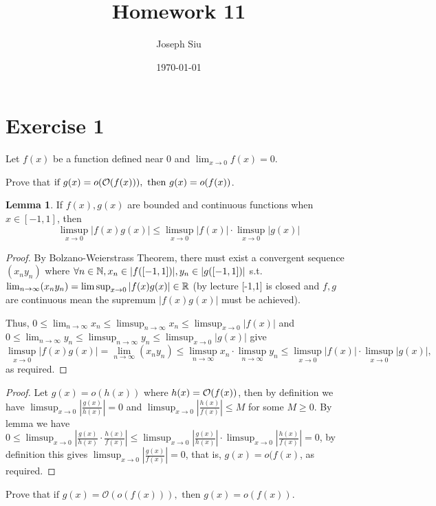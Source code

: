 \documentclass{homework}
\author{Joseph Siu}
\date{\today}
\title{Homework 11}
\newcommand{\R}{\bb{R}} %
\newcommand{\N}{\bb{N}} %
\newcommand{\ra}{\rightarrow}
\newcommand{\?}{\stackrel{?}{=}}
\theoremstyle{definition}
\newtheorem*{lemma}{Lemma}
\begin{document}
 \maketitle

\section*{Exercise 1}

Let $f(x)$ be a function defined near 0 and $\displaystyle\lim_{x\to0}f(x)=0$.

\question[1] Prove that $\textup{if~}g(x)=o(\mathcal{O}(f(x))),\mathrm{~then~}g(x)=o(f(x))$. 

\begin{lemma}
    If $f(x),g(x)$ are bounded and continuous functions when $x\in[-1,1]$, then \[\limsup_{x\to0}|f(x)g(x)|\leq\limsup_{x\to0}|f(x)|\cdot\limsup_{x\to0}|g(x)|\]

    \begin{proof}
        By Bolzano-Weierstrass Theorem, there must exist a convergent sequence $(x_n y_n)$ where $\forall n\in\N, x_n\in |f([-1,1])|, y_n\in |g([-1,1])|$ s.t. $\lim_{n\to\infty}(x_n y_n)=\limsup_{x\to0}|f(x)g(x)|\in\R$ (by lecture [-1,1] is closed and $f,g$ are continuous mean the supremum $|f(x)g(x)|$ must be achieved). 
        
        Thus, $0\leq\lim_{n\ra\infty}x_n\leq\limsup_{n\ra\infty}x_n\leq\limsup_{x\ra0}|f(x)|$ and $0\leq\lim_{n\ra\infty}y_n\leq\limsup_{n\ra\infty}y_n\leq\limsup_{x\ra0}|g(x)|$ give $$\limsup_{x\ra0}|f(x)g(x)|=\lim_{n\ra\infty}(x_n y_n)\leq\limsup_{n\ra\infty}x_n\cdot\limsup_{n\ra\infty}y_n\leq \limsup_{x\to0}|f(x)|\cdot\limsup_{x\to0}|g(x)|,$$ as required. 
    \end{proof}
\end{lemma}

\begin{proof}
    Let $g(x)=o(h(x))$ where $h(x)=\cal{O}(f(x))$, then by definition we have $\limsup_{x\to0}|\frac{g(x)}{h(x)}|=0$ and $\limsup_{x\to0}|\frac{h(x)}{f(x)}|\leq M$ for some $M\geq0$. By lemma we have $0\leq\limsup_{x\ra0}|\frac{g(x)}{h(x)}\cdot\frac{h(x)}{f(x)}|\leq\limsup_{x\ra0}|\frac{g(x)}{h(x)}|\cdot\limsup_{x\ra0}|\frac{h(x)}{f(x)}|=0$, by definition this gives $\limsup_{x\ra0}|\frac{g(x)}{f(x)}|=0$, that is, $g(x)=o(f(x)$, as required. 
\end{proof}

\question[2] Prove that $\text{if~}g(x)=\mathcal{O}(o(f(x))),\text{~then~}g(x)=o(f(x))$.
\end{document}
